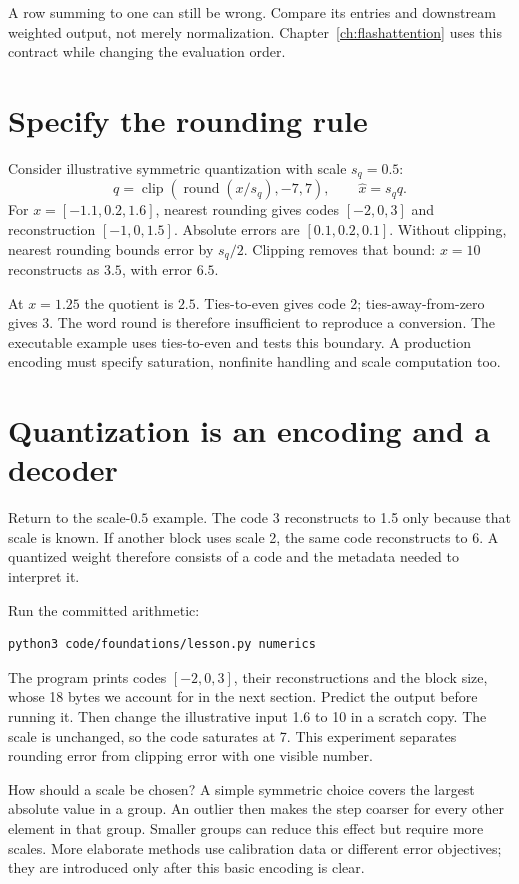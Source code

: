 A row summing to one can still be wrong. Compare its entries and downstream
weighted output, not merely normalization. Chapter~\ref{ch:flashattention}
uses this contract while changing the evaluation order.

\section{Specify the rounding rule}
Consider illustrative symmetric quantization with scale $s_q=0.5$:
\[
 q=\operatorname{clip}(\operatorname{round}(x/s_q),-7,7),
 \qquad \widehat{x}=s_q q.
\]
For $x=[-1.1,0.2,1.6]$, nearest rounding gives codes $[-2,0,3]$
and reconstruction $[-1,0,1.5]$. Absolute errors are $[0.1,0.2,0.1]$.
Without clipping, nearest rounding bounds error by $s_q/2$.
Clipping removes that bound: $x=10$ reconstructs as $3.5$, with error $6.5$.

At $x=1.25$ the quotient is $2.5$. Ties-to-even gives code 2;
ties-away-from-zero gives 3. The word round is therefore insufficient to
reproduce a conversion. The executable example uses ties-to-even and
tests this boundary. A production encoding must specify saturation,
nonfinite handling and scale computation too.

\section{Quantization is an encoding and a decoder}
Return to the scale-$0.5$ example. The code 3 reconstructs to 1.5
only because that scale is known. If another block uses scale 2,
the same code reconstructs to 6. A quantized weight therefore consists
of a code and the metadata needed to interpret it.

Run the committed arithmetic:
\begin{verbatim}
python3 code/foundations/lesson.py numerics
\end{verbatim}
The program prints codes $[-2,0,3]$, their reconstructions and the
block size, whose 18 bytes we account for in the next section.
Predict the output before running it. Then change
the illustrative input 1.6 to 10 in a scratch copy. The scale is
unchanged, so the code saturates at 7. This experiment separates
rounding error from clipping error with one visible number.

How should a scale be chosen? A simple symmetric choice covers the
largest absolute value in a group. An outlier then makes the step
coarser for every other element in that group. Smaller groups can
reduce this effect but require more scales. More elaborate methods
use calibration data or different error objectives; they are
introduced only after this basic encoding is clear.

